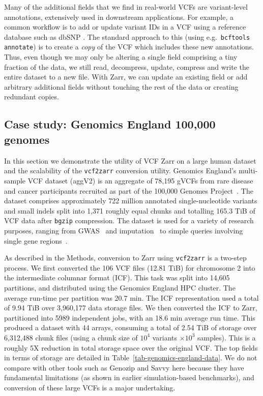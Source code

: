 \documentclass[a4paper,num-refs]{oup-contemporary}
\begin{document}
Many of the additional fields that we find in real-world VCFs are 
variant-level annotations, extensively used in downstream applications.
For example, a common workflow is to 
add or update variant IDs in a VCF using a reference database
such as dbSNP \cite{Sherry2001dbSNP}. The standard approach to this
(using e.g.\ \texttt{bcftools annotate}) is to create a \emph{copy} of 
the VCF which includes these new annotations. Thus, even though 
we may only be altering a single field comprising a tiny fraction 
of the data, we still read, decompress, update, compress and 
write the entire dataset to a new file. With Zarr,
we can update an existing field or add arbitrary additional
fields without touching the rest of the data or creating redundant
copies.

\subsection{Case study: Genomics England 100,000 genomes}
In this section we demonstrate the utility of VCF Zarr on a large human dataset
and the scalability of the \texttt{vcf2zarr} conversion utility.
Genomics England’s multi-sample VCF dataset (aggV2) is an 
aggregate of 78,195 gVCFs from rare disease and cancer participants 
recruited as part of the 100,000 Genomes Project~\cite{turnbull2018100}. 
The dataset comprises approximately 722 million annotated single-nucleotide 
variants and small indels split into 1,371 roughly equal chunks and 
totalling 165.3 TiB of VCF data after \texttt{bgzip} compression. 
The dataset is used for a variety of research purposes, ranging from 
GWAS~\cite{kousathanas2022whole} and 
imputation~\cite{shi2023genomics} to 
simple queries involving single gene 
regions~\cite{leggatt2023genotype,lam2023repeat}.

As described in the Methods, conversion to Zarr using 
\texttt{vcf2zarr} is a two-step process. We 
first converted the 106 VCF files (12.81 TiB) for chromosome 2
into the intermediate columnar format (ICF). This task was 
split into 14,605 partitions, and distributed using the Genomics England
HPC cluster. The average run-time per partition was 20.7 min.
The ICF representation used a total
of 9.94 TiB over 3,960,177 data storage files. 
We then converted the ICF to Zarr, partitioned into
5989 independent jobs, with an 18.6 min average run time.
This produced a dataset with 44 arrays, consuming a 
total of 2.54 TiB of storage over 6,312,488
chunk files (using a chunk size of $10^4$ variants $\times 10^3$ 
samples). This is a roughly 5X reduction in total storage 
space over the original VCF. 
The top fields in terms 
of storage are detailed in Table~\ref{tab-genomics-england-data}.
We do not compare with other tools such as Genozip and 
Savvy here because  they have fundamental limitations 
(as shown in earlier simulation-based benchmarks),
and conversion of these large VCFs is a major undertaking.
\end{document}
